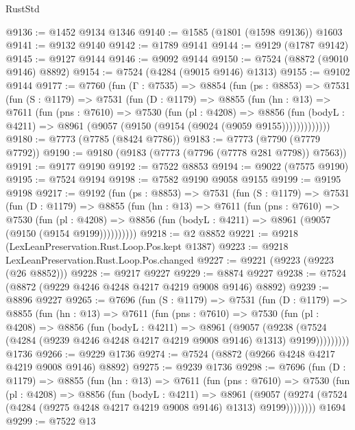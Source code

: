 \begin{lexlean}{RustStd}
\begin{coremodule}
@9136 := @1452 @9134 @1346
@9140 := @1585 (@1801 (@1598 @9136)) @1603
@9141 := @9132 @9140
@9142 := @1789 @9141
@9144 := @9129 (@1787 @9142)
@9145 := @9127 @9144
@9146 := @9092 @9144
@9150 := @7524 (@8872 (@9010 @9146) @8892)
@9154 := @7524 (@4284 (@9015 @9146) @1313)
@9155 := @9102 @9144
@9177 := @7760
    (fun (Γ : @7535) =>
    @8854
      (fun (ps : @8853) =>
      @7531
        (fun (S : @1179) =>
        @7531
          (fun (D : @1179) =>
          @8855
            (fun (hn : @13) =>
            @7611
              (fun (pns : @7610) =>
              @7530
                (fun (pl : @4208) =>
                @8856
                  (fun (bodyL : @4211) =>
                  @8961 (@9057 (@9150 (@9154 (@9024 (@9059 @9155)))))))))))))
@9180 := @7773 (@7785 (@8424 @7786))
@9183 := @7773 (@7790 (@7779 @7792))
@9190 := @9180 (@9183 (@7773 (@7796 (@7778 @281 @7798)) @7563))
@9191 := @9177 @9190
@9192 := @7522 @8853
@9194 := @9022 (@7575 @9190)
@9195 := @7524 @9194
@9198 := @7582 @9190 @9058 @9155
@9199 := @9195 @9198
@9217 := @9192
    (fun (ps : @8853) =>
    @7531
      (fun (S : @1179) =>
      @7531
        (fun (D : @1179) =>
        @8855
          (fun (hn : @13) =>
          @7611
            (fun (pns : @7610) =>
            @7530
              (fun (pl : @4208) =>
              @8856 (fun (bodyL : @4211) => @8961 (@9057 (@9150 (@9154 @9199))))))))))
@9218 := @2 @8852
@9221 := @9218 (LexLeanPreservation.Rust.Loop.Pos.kept @1387)
@9223 := @9218 LexLeanPreservation.Rust.Loop.Pos.changed
@9227 := @9221 (@9223 (@9223 (@26 @8852)))
@9228 := @9217 @9227
@9229 := @8874 @9227
@9238 := @7524 (@8872 (@9229 @4246 @4248 @4217 @4219 @9008 @9146) @8892)
@9239 := @8896 @9227
@9265 := @7696
    (fun (S : @1179) =>
    @7531
      (fun (D : @1179) =>
      @8855
        (fun (hn : @13) =>
        @7611
          (fun (pns : @7610) =>
          @7530
            (fun (pl : @4208) =>
            @8856
              (fun (bodyL : @4211) =>
              @8961
                (@9057
                  (@9238
                    (@7524 (@4284 (@9239 @4246 @4248 @4217 @4219 @9008 @9146) @1313) @9199)))))))))
    @1736
@9266 := @9229 @1736
@9274 := @7524 (@8872 (@9266 @4248 @4217 @4219 @9008 @9146) @8892)
@9275 := @9239 @1736
@9298 := @7696
    (fun (D : @1179) =>
    @8855
      (fun (hn : @13) =>
      @7611
        (fun (pns : @7610) =>
        @7530
          (fun (pl : @4208) =>
          @8856
            (fun (bodyL : @4211) =>
            @8961
              (@9057 (@9274 (@7524 (@4284 (@9275 @4248 @4217 @4219 @9008 @9146) @1313) @9199))))))))
    @1694
@9299 := @7522 @13

\end{coremodule}
\end{lexlean}
